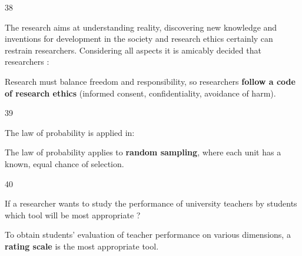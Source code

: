 \begin{question}{38}
{The research aims at understanding reality, discovering new knowledge and inventions for development in the society and research ethics certainly can restrain researchers. Considering all aspects it is amicably decided that researchers :\par}
\begin{explain}
Research must balance freedom and responsibility, so researchers \textbf{follow a code of research ethics} (informed consent, confidentiality, avoidance of harm).
\end{explain}
\end{question}

\begin{question}{39}
{The law of probability is applied in:\par}
\begin{explain}
The law of probability applies to \textbf{random sampling}, where each unit has a known, equal chance of selection.
\end{explain}
\end{question}

\begin{question}{40}
{If a researcher wants to study the performance of university teachers by students which tool will be most appropriate ?\par}
\begin{explain}
To obtain students' evaluation of teacher performance on various dimensions, a \textbf{rating scale} is the most appropriate tool.
\end{explain}
\end{question}

